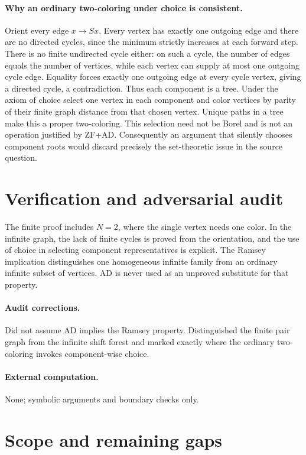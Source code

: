 \documentclass[11pt]{article}
\begin{document}
\paragraph{Why an ordinary two-coloring under choice is consistent.}
Orient every edge $x\to Sx$. Every vertex has exactly one outgoing edge and
there are no directed cycles, since the minimum strictly increases at each
forward step. There is no finite undirected cycle either: on such a cycle,
the number of edges equals the number of vertices, while each vertex can
supply at most one outgoing cycle edge. Equality forces exactly one outgoing
edge at every cycle vertex, giving a directed cycle, a contradiction.
Thus each component is a tree. Under the axiom of choice select one vertex
in each component and color vertices by parity of their finite graph distance
from that chosen vertex. Unique paths in a tree make this a proper two-coloring.
This selection need not be Borel and is not an operation justified by ZF+AD.
Consequently an argument that silently chooses component roots would discard
precisely the set-theoretic issue in the source question.

\section{Verification and adversarial audit}

The finite proof includes $N=2$, where the single vertex needs one color.
In the infinite graph, the lack of finite cycles is proved from the orientation,
and the use of choice in selecting component representatives is explicit.
The Ramsey implication distinguishes one homogeneous infinite family from an
ordinary infinite subset of vertices. AD is never used as an unproved substitute
for that property.

\paragraph{Audit corrections.} Did not assume AD implies the Ramsey property. Distinguished the finite
pair graph from the infinite shift forest and marked exactly where the ordinary
two-coloring invokes component-wise choice.
\paragraph{External computation.} None; symbolic arguments and boundary checks only.
\section{Scope and remaining gaps}
\end{document}
